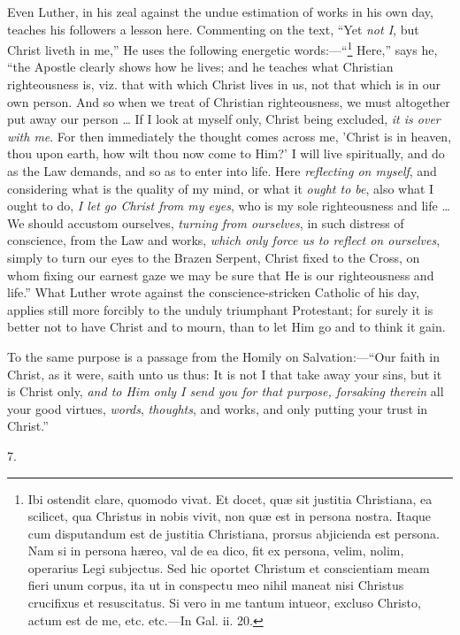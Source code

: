 Even Luther, in his zeal against the undue estimation of works in
his own day, teaches his followers a lesson here. Commenting on
the text, ``Yet \emph{not I}, but Christ liveth in me,'' He
uses the following energetic words:—``\footnote{Ibi ostendit
clare, quomodo vivat. Et docet, quæ sit justitia Christiana, ea
scilicet, qua Christus in nobis vivit, non quæ est in persona nostra.
Itaque cum disputandum est de justitia Christiana, prorsus abjicienda
est persona. Nam si in persona hæreo, val de ea dico, fit ex persona,
velim, nolim, operarius Legi subjectus. Sed hic oportet Christum et
conscientiam meam fieri unum corpus, ita ut in conspectu meo nihil
maneat nisi Christus crucifixus et resuscitatus. Si vero in me tantum
intueor, excluso Christo, actum est de me, etc. etc.—In Gal. ii. 20.} Here,'' says he, ``the Apostle clearly shows how he
lives; and he teaches what Christian righteousness is, viz. that with
which Christ lives in us, not that which is in our own person. And so
when we treat of Christian righteousness, we must altogether put away
our person … If I look at myself only, Christ being excluded, \emph{it
is over with me}. For then immediately the thought comes across me,
'Christ is in heaven, thou upon earth, how wilt thou now come to Him?'
I will live spiritually, and do as the Law demands, and so as to enter
into life. Here \emph{reflecting on myself}, and considering what is
the quality of my mind, or what it \emph{ought to be}, also what I
ought to do, \emph{I let go Christ from my eyes}, who is my sole
righteousness and life …We should accustom ourselves, \emph{turning
from ourselves}, in such distress of conscience, from the Law and
works, \emph{which only force us to reflect on ourselves}, simply to
turn our eyes to the Brazen Serpent, Christ fixed to the Cross, on
whom fixing our earnest gaze we may be sure that He is our
righteousness and life.'' What Luther wrote against the
conscience-stricken Catholic of his day, applies still more forcibly
to the unduly triumphant Protestant; for surely it is better not
to have Christ and to mourn, than to let Him go and to think it gain.

To the same purpose is a passage from the Homily on Salvation:—``Our
faith in Christ, as it were, saith unto us thus: It is not I that take
away your sins, but it is Christ only, \emph{and to Him only I send you
for that purpose, forsaking therein} all your good virtues, \emph{words},
\emph{thoughts}, and works, and only putting your trust in
Christ.''

7.

